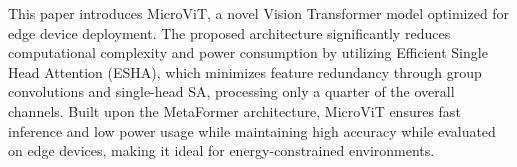 This paper introduces MicroViT, a novel Vision Transformer model optimized for edge device deployment. The proposed architecture significantly reduces computational complexity and power consumption by utilizing Efficient Single Head Attention (ESHA), which minimizes feature redundancy through group convolutions and single-head SA, processing only a quarter of the overall channels. Built upon the MetaFormer architecture, MicroViT ensures fast inference and low power usage while maintaining high accuracy while evaluated on edge devices, making it ideal for energy-constrained environments.